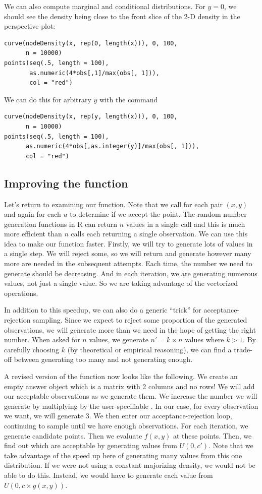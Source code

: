 We can also compute marginal and conditional distributions.  For $y =
0$, we should see the density being close to the front slice of the 2-D
density in the perspective plot:
\begin{verbatim}
curve(nodeDensity(x, rep(0, length(x))), 0, 100, 
      n = 10000)
points(seq(.5, length = 100), 
       as.numeric(4*obs[,1]/max(obs[, 1])), 
       col = "red")
\end{verbatim}
We can do this for arbitrary $y$
with the command
\begin{verbatim}
curve(nodeDensity(x, rep(y, length(x))), 0, 100, 
      n = 10000)
points(seq(.5, length = 100), 
      as.numeric(4*obs[,as.integer(y)]/max(obs[, 1])), 
      col = "red")
\end{verbatim}

\subsection{Improving the function}
Let's return to examining our function.  Note that we call
 for each pair $(x, y)$ and again for each $u$ to
determine if we accept the point.  The random number generation
functions in R can return $n$ values in a single call and this is much
more efficient than $n$ calls each returning a single observation.  We
can use this idea to make our function faster.  Firstly, we will try
to generate lots of values in a single step.  We will reject some, so
we will return and generate however many more are needed in the
subsequent attempts.  Each time, the number we need to generate should
be decreasing.  And in each iteration, we are generating numerous
values, not just a single value. So we are taking advantage of the
vectorized operations.

In addition to this speedup, we can also do a generic ``trick'' for
acceptance-rejection sampling.  Since we expect to reject some
proportion of the generated observations, we will generate more than
we need in the hope of getting the right number.  When asked for $n$
values, we generate $n' = k \times n$ values where $k > 1$.  By
carefully choosing $k$ (by theoretical or empirical reasoning), we can
find a trade-off between generating too many and not generating
enough.


A revised version of the function now looks like the following.  We
create an empty answer object which is a matrix with 2 columns and no
rows! We will add our acceptable observations as we generate them.  We
increase the number we will generate by multiplying by the
user-specifiable .  In our case, for every observation we
want, we will generate 3.  We then enter our acceptance-rejection
loop, continuing to sample until we have enough observations.  For
each iteration, we generate  candidate points.  Then
we evaluate $f(x, y)$ at these points.  Then, we find out which are
acceptable by generating  values from $U(0, c')$.
Note that we take advantage of the speed up here of generating many
values from this one distribution.  If we were not using a constant
majorizing density, we would not be able to do this. Instead, we would
have to generate each value from $U(0, c \times g(x, y))$.


